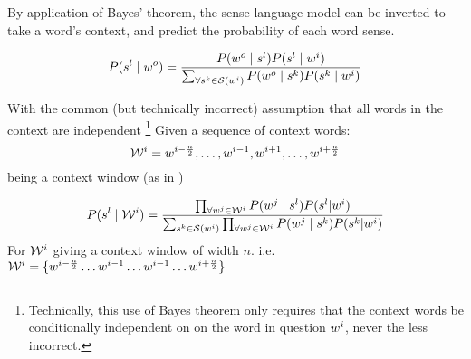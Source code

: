 \documentclass[12pt,parskip]{komatufte}
\begin{document}
By application of Bayes' theorem, the sense language model can be inverted to take a word's context,
and predict the probability of each word sense.

\begin{equation}
P(\n s_l \mid \n w_o) = \frac{P(\n w_o \mid \n s_l) P(\n s_l \mid \n w_i)}{\sum_{\forall \n s_k \in \seq S(\n w_i)} P(\n w_o \mid \n s_k) P(\n s_k \mid \n w_i)}
\end{equation}

With the common (but technically incorrect) assumption that all words in the context are independent \footnote{Technically, this use of Bayes theorem only requires that the context words be conditionally independent on on the word in question $\n w_i$, never the less incorrect.}
Given a sequence of context words:
\begin{equation}
\n \seq{W}_i = \n w_{i-\frac{n}{2}},\ldots, \n w_{i-1}, \n w_{i+1},\ldots, \n w_{i+\frac{n}{2}}
\end{equation}
being a context window (as in )

\begin{equation}
P(\n s_l \mid \n \seq{W}_i) = 
\frac{\prod_{\forall \n w_{j}\in \n \seq{W}_i} P(\n w_{j} \mid \n s_l) P(\n s_l | \n w_i)}{\sum_{\n s_k \in \seq S(\n w_i)} \prod_{\forall \n w_{j} \in \n \seq{W}_i} P(\n w_{j} \mid \n s_k) P(\n s_k | \n w_i)}
\end{equation}
For $\n \seq{W}_i$ giving a context window of width $n$. i.e. $\n \seq{W}_i = \lbrace \n w_{i-\frac{n}{2}} \ldots \n w_{i-1} \ldots \n w_{i-1} \ldots \n w_{i+\frac{n}{2}} \rbrace$


%
\end{document}
